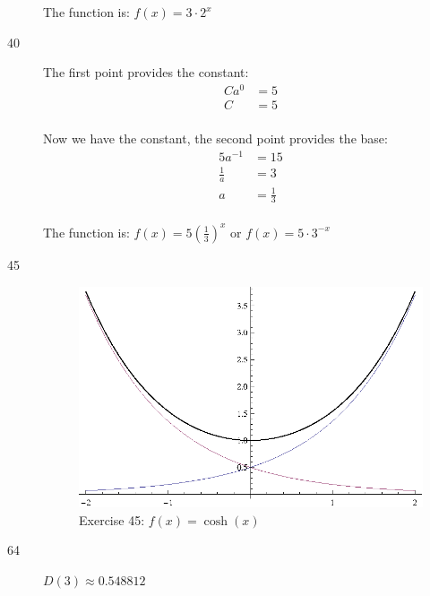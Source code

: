 \documentclass{exam}
\begin{document}
\begin{description}
        The function is: $f(x) = 3 \cdot 2^x$

      \item[40]
        The first point provides the constant:
        \begin{align*}
          Ca^0 &= 5 \\
          C    &= 5 \\
        \end{align*}

        Now we have the constant, the second point provides the base:
        \begin{align*}
          5a^{-1}     &= 15 \\
          \frac{1}{a} &= 3 \\
          a           &= \frac{1}{3} \\
        \end{align*}

        The function is: $f(x) = 5 \left( \frac{1}{3} \right)^x$ or $f(x) = 5 \cdot 3^{-x}$

      \item[45] 
        \begin{figure}[H]
          \centering
          \includegraphics[scale=1.0]{exercise45.eps}
          \caption*{Exercise 45: $f(x) = \cosh(x)$}
        \end{figure}

      \item[64] $D(3) \approx 0.548812$



\end{description}
\end{document}
